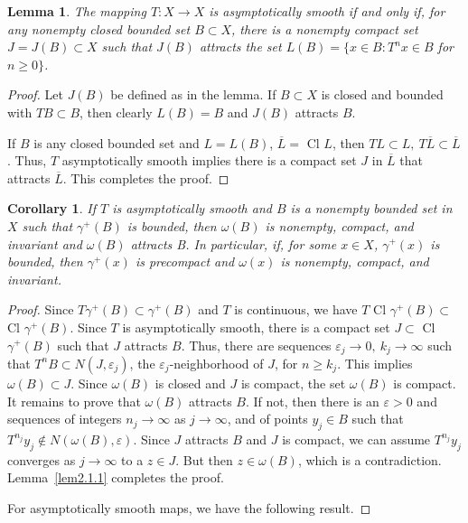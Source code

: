 \documentclass{surv-l}
\theoremstyle{plain}
\newtheorem{corollary}[theorem]{Corollary}
\newtheorem{lemma}[theorem]{Lemma}
\theoremstyle{definition}
\numberwithin{equation}{section}
\numberwithin{figure}{chapter}
\begin{document}
\begin{lemma}\label{lem2.2.3} The mapping $T\!:X\rightarrow X$ is asymptotically smooth if and
only if, for any nonempty closed bounded set $B\subset X$, there is a nonempty compact set $J=J(B)\subset X$ such that $J(B)$ attracts the set $L(B)=\{x \in B\!:T^{n}x\in B$ for $n\geq 0\}$.
\end{lemma}

\begin{proof}
Let $J(B)$ be defined as in the lemma. If $B\subset X$ is closed and bounded with $TB\subset B$, then clearly $L(B)=B$ and $J(B)$ attracts $B$.

If $B$ is any closed bounded set and $L=L(B)$, $\overline{L}=$ Cl $L$, then $TL\subset L,\ T\overline{L}\subset\overline{L}$. Thus, $T$ asymptotically smooth implies there is a compact set $J$ in $\overline{L}$ that attracts $\overline{L}$. This completes the proof.
\end{proof}


\begin{corollary}\label{cor2.2.4}
If $T$ is asymptotically smooth and $B$ is a nonempty
bounded set in $X$ such that $\gamma^{+}(B)$ is bounded, then $\omega(B)$ is nonempty, compact, and invariant and $\omega(B)$ attracts B. In particular, if, for some $x\in X$, $\gamma^{+}(x)$ is bounded, then $\gamma^{+}(x)$ is precompact and $\omega(x)$ is nonempty, compact, and invariant.
\end{corollary}

\begin{proof}
Since $T\gamma^{+}(B)\subset\gamma^{+}(B)$ and $T$ is continuous, we have $T$ Cl $\gamma^{+}(B)\subset$ Cl $\gamma^{+}(B)$. Since $T$ is asymptotically smooth, there is a compact set $ J\subset$ Cl $\gamma^{+}(B)$ such that $J$ attracts $B$. Thus, there are sequences $\varepsilon_{j}\rightarrow 0,\ k_{j}\rightarrow\infty$ such that $T^{n}B\subset N(J, \varepsilon_{j})$, the $\varepsilon_{j}$-neighborhood of $J$, for $n\geq k_{j}$. This implies $\omega(B)\subset J$. Since $\omega(B)$ is closed and $J$ is compact, the set $\omega(B)$ is compact. It remains to prove that $\omega(B)$ attracts $B$. If not, then there is an $\varepsilon >0$ and sequences of integers $ n_{j}\rightarrow\infty$ as $ j\rightarrow\infty$, and of points $y_{j}\in B$ such that $T^{n_{j}}y_{j}\not\in N(\omega(B), \varepsilon)$. Since $J$ attracts $B$ and $J$ is compact, we can assume $T^{n_{j}}y_{j}$ converges as $ j\rightarrow\infty$ to a $z\in J$. But then $z\in\omega(B)$, which is a contradiction. Lemma~\ref{lem2.1.1} completes the proof.

For asymptotically smooth maps, we have the following result.
\end{proof}
\end{document}
